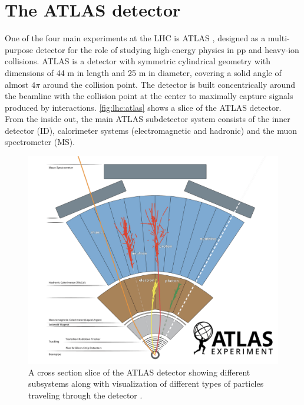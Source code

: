 \documentclass[../thesis.tex]{subfiles}
\begin{document}
\section{The ATLAS detector}
\label{sec:ATLAS}

One of the four main experiments at the \acs{LHC} is \acs{ATLAS} \citep{atlas}, designed as a multi-purpose detector for the role of studying high-energy physics in \acs{pp} and heavy-ion collisions. \acs{ATLAS} is a detector with symmetric cylindrical geometry with dimensions of 44 m in length and 25 m in diameter, covering a solid angle of almost $4\pi$ around the collision point. The detector is built concentrically around the beamline with the collision point at the center to maximally capture signals produced by interactions. \autoref{fig:lhc:atlas} shows a slice of the ATLAS detector. From the inside out, the main \acs{ATLAS} subdetector system consists of the inner detector (\acs{ID}), calorimeter systems (electromagnetic and hadronic) and the muon spectrometer (\acs{MS}).

\begin{figure}[!htb]
\begin{center}
\includegraphics[width=\linewidth]{fig/lhc_atlas_particle_path_white.png}
\caption[A cross section slice of the ATLAS detector showing different subsystems along with visualization of different types of particles traveling through the detector]{\label{fig:lhc:atlas}A cross section slice of the \acs{ATLAS} detector showing different subsystems along with visualization of different types of particles traveling through the detector \citep{lhc:atlas_detector}.}
\end{center}
\end{figure}
\end{document}
